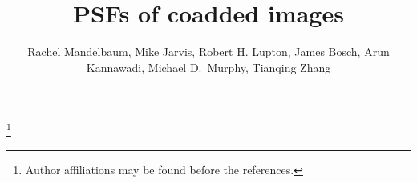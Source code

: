 \documentclass{openjournal}
\newcommand\blfootnote[1]{%
  \begingroup
  \renewcommand\thefootnote{}\footnote{#1}%
  \addtocounter{footnote}{1}%
  \endgroup
}
\begin{document}
\title{PSFs of coadded images}

\author{Rachel Mandelbaum, Mike Jarvis, Robert H. Lupton, James Bosch, Arun Kannawadi, Michael D.\ Murphy, Tianqing Zhang}
\noaffiliation

\blfootnote{Author affiliations may be found before the references.} 


%
%
%
%
%
%



\end{document}
